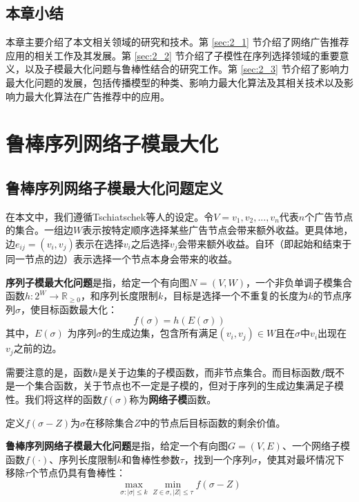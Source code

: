 \section{本章小结}

本章主要介绍了本文相关领域的研究和技术。第 \ref{sec:2_1} 节介绍了网络广告推荐应用的相关工作及其发展。第 \ref{sec:2_2} 节介绍了子模性在序列选择领域的重要意义，以及子模最大化问题与鲁棒性结合的研究工作。第 \ref{sec:2_3} 节介绍了影响力最大化问题的发展，包括传播模型的种类、影响力最大化算法及其相关技术以及影响力最大化算法在广告推荐中的应用。



\chapter{鲁棒序列网络子模最大化}

\section{鲁棒序列网络子模最大化问题定义}
\label{sec:3_1}
在本文中，我们遵循Tschiatschek等人\cite{tschiatschek2017selecting}的设定。令$V={v_1,v_2,...,v_n}$代表$n$个广告节点的集合。一组边\(W\)表示按特定顺序选择某些广告节点会带来额外收益。更具体地，边\(e_{ij} = (v_i,v_j)\)表示在选择\(v_i\)之后选择\(v_j\)会带来额外收益。自环（即起始和结束于同一节点的边）表示选择一个节点本身会带来的收益。

\begin{definition}
{\bfseries 序列子模最大化问题}是指，给定一个有向图\(N = (V,W)\)，一个非负单调子模集合函数\(h: 2^W \rightarrow \mathbb{R}_{\ge 0}\)，和序列长度限制\(k\)，目标是选择一个不重复的长度为\(k\)的节点序列\(\sigma\)，使目标函数最大化：
\begin{equation}
    f(\sigma)=h(E(\sigma))
\end{equation}
\noindent 其中，\(E(\sigma)\) 为序列$\sigma$的生成边集，包含所有满足\((v_i,v_j)\in W\)且在\(\sigma\)中\(v_i\)出现在\(v_j\)之前的边。
\end{definition}

需要注意的是，函数\(h\)是关于边集的子模函数，而非节点集合。而目标函数\(f\)既不是一个集合函数，关于节点也不一定是子模的，但对于序列的生成边集满足子模性。我们将这样的函数\(f(\sigma)\)称为{\bfseries 网络子模}函数。

定义\(f(\sigma - Z)\)为$\sigma$在移除集合\(Z\)中的节点后目标函数的剩余价值。
\begin{definition}
{\bfseries 鲁棒序列网络子模最大化问题}是指，给定一个有向图\(G=(V,E)\)、一个网络子模函数\(f(\cdot)\)、序列长度限制$k$和鲁棒性参数\(\tau\)，找到一个序列\(\sigma\)，使其对最坏情况下移除\(\tau\)个节点仍具有鲁棒性：
\begin{equation}
    \max_{\sigma:|\sigma|\le k} \min_{Z\in \sigma,|Z|\le \tau} f(\sigma - Z)
\end{equation}
\end{definition}

